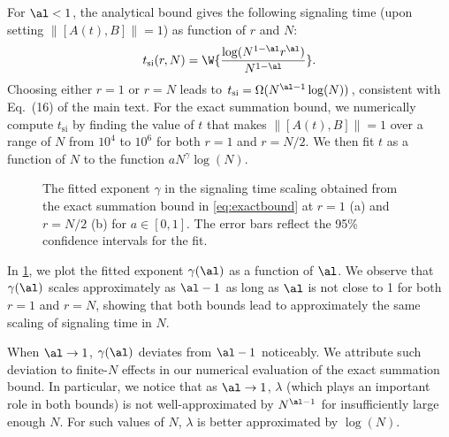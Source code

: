 For $\al < 1$, the analytical bound gives the following signaling time (upon setting $\|[A(t),B]\|= 1$) as function of $r$ and $N$:
\begin{equation}
	\label{eq:contour_al<D}
	t_\text{si}(r,N) =\W{\frac{\log(N^{1-\al}r^{\al})}{N^{1-\al}}}.
\end{equation}
Choosing either $r=1$ or $r=N$ leads to $t_\text{si}=\Omega(N^{\al-1}\log(N))$, consistent with Eq.~(16) of the main text. For the exact summation bound, we numerically compute $t_\text{si}$ by finding the value of $t$ that makes $\|[A(t),B]\| = 1$ over a range of $N$ from $10^4$ to $10^6$ for both $r = 1$ and $r = N/2$. We then fit $t$ as a function of $N$ to the function $a N^\gamma \log(N)$.
\begin{figure}[h]
	 \qquad
	\caption{The fitted exponent $\gamma$ in the signaling time scaling obtained from the exact summation bound in \cref{eq:exactbound} at $r=1$ (a) and $r=N/2$ (b) for $a\in [0,1]$. The error bars reflect the 95\% confidence intervals for the fit.}
        \label{Fig_al<D}
\end{figure}
In \cref{Fig_al<D}, we plot the fitted exponent $\gamma(\al)$ as a function of $\al$. We observe that $\gamma(\al)$ scales approximately as $\al-1$ as long as $\al$ is not close to 1 for both $r=1$ and $r=N$, showing that both bounds lead to approximately the same scaling of signaling time in $N$.

When $\al\rightarrow 1$, $\gamma(\al)$ deviates from $\al-1$ noticeably. We attribute such deviation to finite-$N$ effects in our numerical evaluation of the exact summation bound. In particular, we notice that as $\al\rightarrow 1$, $\lambda$ (which plays an important role in both bounds) is not well-approximated by $N^{\al-1}$ for insufficiently large enough $N$. For such values of $N$, $\lambda$ is better approximated by $\log(N)$.

